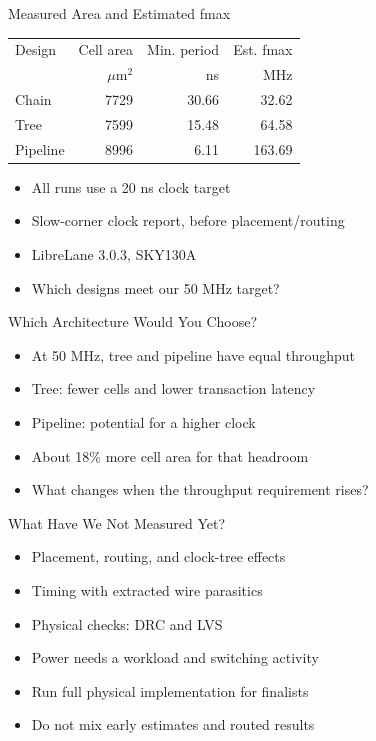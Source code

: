\begin{frame}{Measured Area and Estimated fmax}
\begin{center}
\small
\begin{tabular}{lrrr}
\toprule
Design & Cell area & Min. period & Est. fmax\\
 & $\mu$m$^2$ & ns & MHz\\
\midrule
Chain & 7729 & 30.66 & 32.62\\
Tree & 7599 & 15.48 & 64.58\\
Pipeline & 8996 & 6.11 & 163.69\\
\bottomrule
\end{tabular}
\end{center}
\begin{itemize}
\item All runs use a 20 ns clock target
\item Slow-corner clock report, before placement/routing
\item LibreLane 3.0.3, SKY130A
\item Which designs meet our 50 MHz target?
\end{itemize}
\end{frame}


\begin{frame}{Which Architecture Would You Choose?}
\begin{itemize}
\item At 50 MHz, tree and pipeline have equal throughput
\item Tree: fewer cells and lower transaction latency
\item Pipeline: potential for a higher clock
\item About 18\% more cell area for that headroom
\item What changes when the throughput requirement rises?
\end{itemize}
\end{frame}



\begin{frame}{What Have We Not Measured Yet?}
\begin{itemize}
\item Placement, routing, and clock-tree effects
\item Timing with extracted wire parasitics
\item Physical checks: DRC and LVS
\item Power needs a workload and switching activity
\item Run full physical implementation for finalists
\item Do not mix early estimates and routed results
\end{itemize}
\end{frame}

